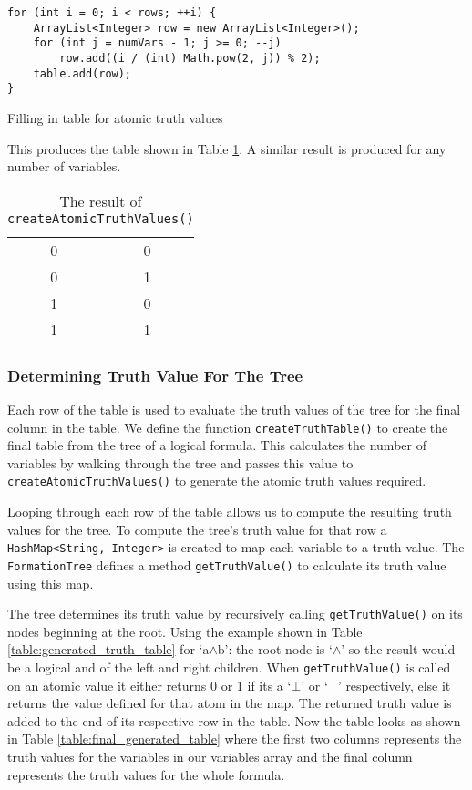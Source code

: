 \documentclass{report}
\begin{document}
\begin{listing}[ht]
\begin{verbatim} 
for (int i = 0; i < rows; ++i) {
    ArrayList<Integer> row = new ArrayList<Integer>();
    for (int j = numVars - 1; j >= 0; --j)
        row.add((i / (int) Math.pow(2, j)) % 2);
    table.add(row);
}
\end{verbatim}
\caption{Filling in table for atomic truth values}
\label{listing:create_truth_table}
\end{listing}

This produces the table shown in Table \ref{table:generated_atomic_truth_values}. A similar result is produced for any number of variables.

\begin{table}[h]
  \begin{center}
    \begin{tabular}{ || c | c || }
      \hline
      0 & 0 \\
      0 & 1 \\
      1 & 0 \\
      1 & 1 \\
      \hline
    \end{tabular}
  \end{center}
  \caption{The result of {\tt createAtomicTruthValues()}}
  \label{table:generated_atomic_truth_values}
\end{table}

\subsubsection{Determining Truth Value For The Tree}

Each row of the table is used to evaluate the truth values of the tree for the final column in the table. We define the function {\tt createTruthTable()} to create the final table from the tree of a logical formula. This calculates the number of variables by walking through the tree and passes this value to {\tt createAtomicTruthValues()} to generate the atomic truth values required. 

Looping through each row of the table allows us to compute the resulting truth values for the tree. To compute the tree's truth value for that row a {\tt HashMap<String, Integer>} is created to map each variable to a truth value. The {\tt FormationTree} defines a method {\tt getTruthValue()} to calculate its truth value using this map.

The tree determines its truth value by recursively calling {\tt getTruthValue()} on its nodes beginning at the root. Using the example shown in Table \ref{table:generated_truth_table} for `a$\land$b': the root node is `$\land$' so the result would be a logical and of the left and right children. When {\tt getTruthValue()} is called on an atomic value it either returns 0 or 1 if its a `$\bot$' or `$\top$' respectively, else it returns the value defined for that atom in the map. The returned truth value is added to the end of its respective row in the table. Now the table looks as shown in Table \ref{table:final_generated_table} where the first two columns represents the truth values for the variables in our variables array and the final column represents the truth values for the whole formula.
\end{document}
